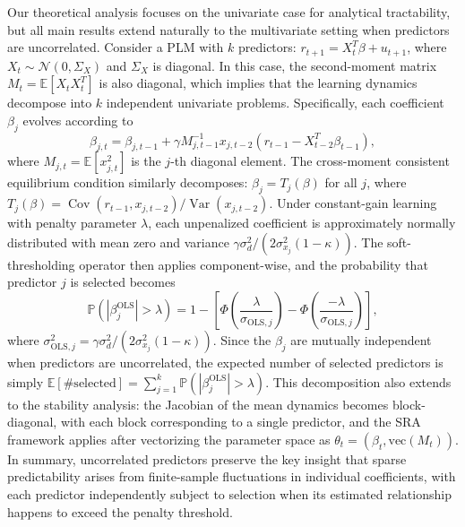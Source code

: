 Our theoretical analysis focuses on the univariate case for analytical tractability, but all main results extend naturally to the multivariate setting when predictors are uncorrelated.
Consider a PLM with $k$ predictors: $r_{t+1} = X_t^T \beta + u_{t+1}$, where $X_t \sim \mathcal{N}(0, \Sigma_X)$ and $\Sigma_X$ is diagonal.
In this case, the second-moment matrix $M_t = \mathbb{E}[X_t X_t^T]$ is also diagonal, which implies that the learning dynamics decompose into $k$ independent univariate problems.
Specifically, each coefficient $\beta_j$ evolves according to
\begin{equation}
\beta_{j,t} = \beta_{j,t-1} + \gamma M^{-1}_{j,t-1} x_{j,t-2} \left(r_{t-1} - X_{t-2}^T \beta_{t-1}\right),
\end{equation}
where $M_{j,t} = \mathbb{E}[x_{j,t}^2]$ is the $j$-th diagonal element.
The cross-moment consistent equilibrium condition similarly decomposes: $\beta_j = T_j(\beta)$ for all $j$, where $T_j(\beta) = \operatorname{Cov}(r_{t-1}, x_{j,t-2})/\operatorname{Var}(x_{j,t-2})$.
Under constant-gain learning with penalty parameter $\lambda$, each unpenalized coefficient is approximately normally distributed with mean zero and variance $\gamma \sigma_d^2/(2\sigma^2_{x_j}(1-\kappa))$.
The soft-thresholding operator then applies component-wise, and the probability that predictor $j$ is selected becomes
\begin{equation}
\mathbb{P}(|\beta^{\text{OLS}}_j| > \lambda) = 1 - \left[\Phi\left(\frac{\lambda}{\sigma_{\text{OLS},j}}\right) - \Phi\left(\frac{-\lambda}{\sigma_{\text{OLS},j}}\right)\right],
\end{equation}
where $\sigma_{\text{OLS},j}^2 = \gamma \sigma_d^2/(2\sigma^2_{x_j}(1-\kappa))$.
Since the $\beta_j$ are mutually independent when predictors are uncorrelated, the expected number of selected predictors is simply $\mathbb{E}[\text{\# selected}] = \sum_{j=1}^k \mathbb{P}(|\beta^{\text{OLS}}_j| > \lambda)$.
This decomposition also extends to the stability analysis: the Jacobian of the mean dynamics becomes block-diagonal, with each block corresponding to a single predictor, and the SRA framework applies after vectorizing the parameter space as $\theta_t = (\beta_t, \text{vec}(M_t))$.
In summary, uncorrelated predictors preserve the key insight that sparse predictability arises from finite-sample fluctuations in individual coefficients, with each predictor independently subject to selection when its estimated relationship happens to exceed the penalty threshold.


